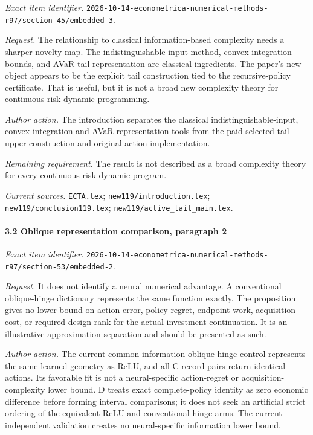 \emph{Exact item identifier.} \nolinkurl{2026-10-14-econometrica-numerical-methods-r97/section-45/embedded-3}.

\par\emph{Request.} The relationship to classical information-based complexity needs a sharper novelty map. The indistinguishable-input method, convex integration bounds, and AVaR tail representation are classical ingredients. The paper's new object appears to be the explicit tail construction tied to the recursive-policy certificate. That is useful, but it is not a broad new complexity theory for continuous-risk dynamic programming.

\par\emph{Author action.} The introduction separates the classical indistinguishable-input, convex integration and AVaR representation tools from the paid selected-tail upper construction and original-action implementation.

\par\emph{Remaining requirement.} The result is not described as a broad complexity theory for every continuous-risk dynamic program.

\par\emph{Current sources.} \nolinkurl{ECTA.tex}; \nolinkurl{new119/introduction.tex}; \nolinkurl{new119/conclusion119.tex}; \nolinkurl{new119/active_tail_main.tex}.

\paragraph{3.2 Oblique representation comparison, paragraph 2}

\emph{Exact item identifier.} \nolinkurl{2026-10-14-econometrica-numerical-methods-r97/section-53/embedded-2}.

\par\emph{Request.} It does not identify a neural numerical advantage. A conventional oblique-hinge dictionary represents the same function exactly. The proposition gives no lower bound on action error, policy regret, endpoint work, acquisition cost, or required design rank for the actual investment continuation. It is an illustrative approximation separation and should be presented as such.

\par\emph{Author action.} The current common-information oblique-hinge control represents the same learned geometry as ReLU, and all C record pairs return identical actions. Its favorable fit is not a neural-specific action-regret or acquisition-complexity lower bound. D treats exact complete-policy identity as zero economic difference before forming interval comparisons; it does not seek an artificial strict ordering of the equivalent ReLU and conventional hinge arms. The current independent validation creates no neural-specific information lower bound.

